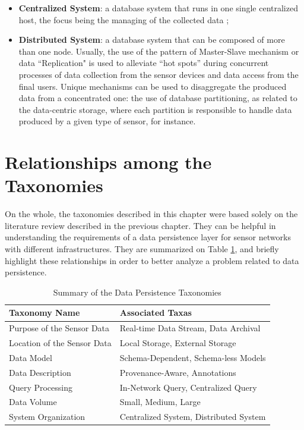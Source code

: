 \begin{itemize}
  \item \textbf{Centralized System}: a database system that runs in one single
  centralized host, the focus being the managing of the collected data
  \cite{sn-intro01};
  \item \textbf{Distributed System}: a database system that can be composed of
  more than one node. Usually, the use of the pattern of Master-Slave
  mechanism or data ``Replication" is used to alleviate ``hot spots'' during
  concurrent processes of data collection from the sensor devices and data
  access from the final users. Unique mechanisms can be used to disaggregate 
  the produced data from a concentrated one: the use of database partitioning, 
  as related to the data-centric storage, where each partition is responsible 
  to handle data produced by a given type of sensor, for instance.
\end{itemize}

\section{Relationships among the Taxonomies}

On the whole, the taxonomies described in this chapter were based solely on the
literature review described in the previous chapter. They can be helpful in 
understanding the requirements of a data persistence layer for sensor networks
with different infrastructures. They are summarized on Table
\ref{tab:taxonomies-list-summary}, and briefly highlight these
relationships in order to better analyze a problem related to data persistence.

\begin{table}[!b]
    \label{tab:taxonomies-list-summary}
    \begin{center}
        \begin{tabular}{|p{170pt}|p{250pt}|}\hline 
        \textbf{Taxonomy Name} & \textbf{Associated Taxas}\\\hline 
        Purpose of the Sensor Data & Real-time Data Stream, Data Archival \\\hline 
        Location of the Sensor Data & Local Storage, External Storage\\\hline
        Data Model & Schema-Dependent, Schema-less Models\\\hline 
        Data Description & Provenance-Aware, Annotations\\\hline
        Query Processing & In-Network Query, Centralized Query\\\hline 
        Data Volume & Small, Medium, Large\\\hline
        System Organization & Centralized System, Distributed System\\\hline
        \end{tabular}
    \end{center}
    \caption{Summary of the Data Persistence Taxonomies}
\end{table}

